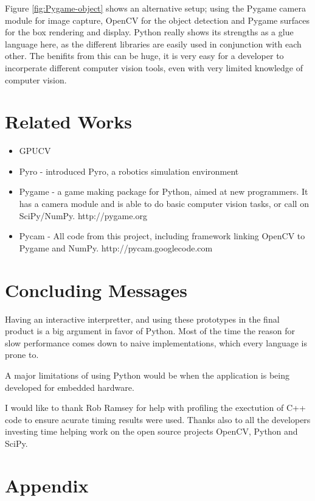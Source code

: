 \documentclass[english]{IEEEtran}
\theoremstyle{plain}
\begin{document}
Figure \ref{fig:Pygame-object} shows an alternative setup; using
the Pygame camera module for image capture, OpenCV for the object
detection and Pygame surfaces for the box rendering and display. Python
really shows its strengths as a glue language here, as the different
libraries are easily used in conjunction with each other. The benifits
from this can be huge, it is very easy for a developer to incorperate
different computer vision tools, even with very limited knowledge
of computer vision.


\section{Related Works}


\begin{itemize}
\item GPUCV\cite{farrugia2006gpucv}\cite{allusse2008gpucv}
\item Pyro - \cite{blank2003pyro} introduced Pyro, a robotics simulation
environment
\item Pygame - a game making package for Python, aimed at new programmers.
It has a camera module and is able to do basic computer vision tasks,
or call on SciPy/NumPy. http://pygame.org
\item Pycam - All code from this project, including framework linking OpenCV
to Pygame and NumPy. http://pycam.googlecode.com
\end{itemize}

\section{Concluding Messages}

Having an interactive interpretter, and using these prototypes in
the final product is a big argument in favor of Python. Most of the
time the reason for slow performance comes down to naive implementations,
which every language is prone to.

A major limitations of using Python would be when the application
is being developed for embedded hardware. 

I would like to thank Rob Ramsey for help with profiling the exectution
of C++ code to ensure acurate timing results were used. Thanks also
to all the developers investing time helping work on the open source
projects OpenCV, Python and SciPy.


\section{Appendix}
\end{document}
